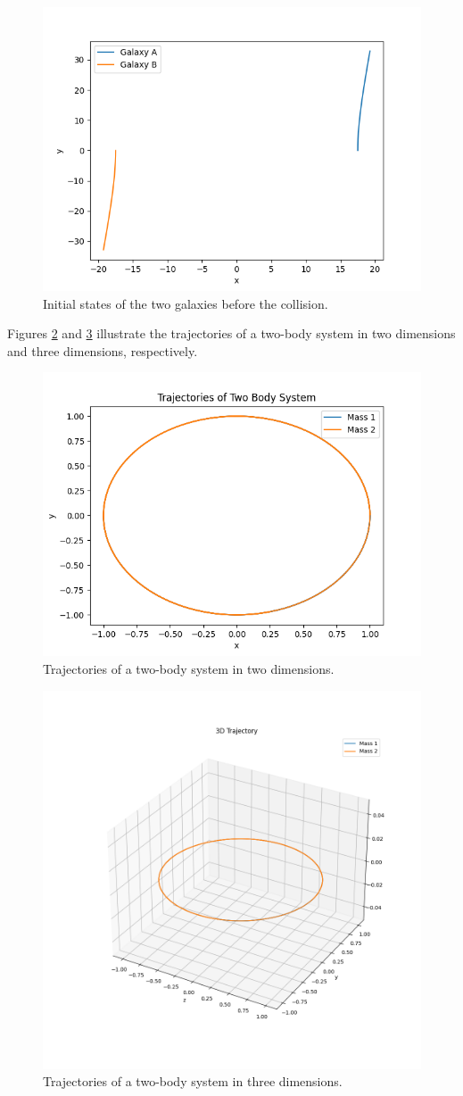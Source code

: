 \documentclass[reprint, amsmath, amssymb, aps]{revtex4-2}
\begin{document}
\begin{figure}[htb]
    \centering
    \includegraphics[width=0.7\columnwidth]{figures/1.png}
    \caption{Initial states of the two galaxies before the collision.}
    \label{fig:initial}
\end{figure}

Figures \ref{fig:2d} and \ref{fig:3d} illustrate the trajectories of a two-body system in two dimensions and three dimensions, respectively.

\begin{figure}[htb]
    \centering
    \includegraphics[width=0.7\columnwidth]{figures/2.png}
    \caption{Trajectories of a two-body system in two dimensions.}
    \label{fig:2d}
\end{figure}

\begin{figure}[htb]
    \centering
    \includegraphics[width=0.7\columnwidth]{figures/3.png}
    \caption{Trajectories of a two-body system in three dimensions.}
    \label{fig:3d}
\end{figure}
\end{document}
